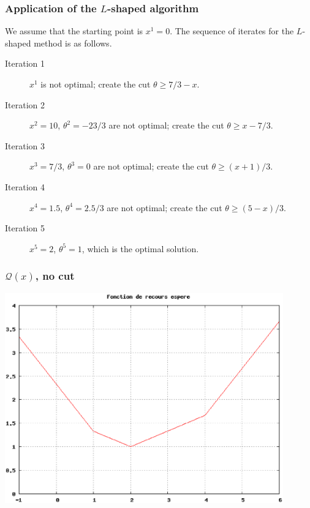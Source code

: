 \documentclass{beamer}
\begin{document}
\begin{frame}
\frametitle{Application of the $L$-shaped algorithm}
	
We assume that the starting point is $x^1 = 0$.
The sequence of iterates for the $L$-shaped method is as follows.

\mbox{}
	
\begin{description}
\item[Iteration 1] $x^1$ is not optimal; create the cut $\theta \geq 7/3 - x$.
\item[Iteration 2] $x^2 = 10$, $\theta^2 = -23/3$ are not optimal; create the cut $\theta \geq x- 7/3$.
\item[Iteration 3] $x^3 = 7/3$, $\theta^3 = 0$ are not optimal; create the cut $\theta \geq (x+1)/3$.
\item[Iteration 4] $x^4 = 1.5$, $\theta^4 = 2.5/3$ are not optimal; create the cut $\theta \geq (5-x)/3$.
\item[Iteration 5] $x^5 = 2$, $\theta^5 = 1$, which is the optimal solution.
\end{description}
	
\end{frame}

\begin{frame}
	\frametitle{$\mathcal{Q}(x)$, no cut}
	
	\includegraphics[width=0.9\textwidth]{all.eps}
	
\end{frame}
\end{document}
